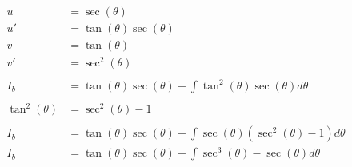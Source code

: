 \documentclass[12pt]{article}
\begin{document}
\begin{align}
    u                                                & = \sec(\theta)                                                                                                                                    \\
    u'                                               & = \tan(\theta)\sec(\theta)                                                                                                                        \\
    v                                                & = \tan(\theta)                                                                                                                                    \\
    v'                                               & = \sec^2(\theta)                                                                                                                                  \\
    \nonumber                                                                                                                                                                                            \\
    I_b                                              & = \tan(\theta)\sec(\theta) - \int \tan^2(\theta)\sec(\theta) d\theta                                                                              \\
    \nonumber                                                                                                                                                                                            \\
    \tan^2(\theta)                                   & = \sec^2(\theta) - 1                                                                                                                              \\
    \nonumber                                                                                                                                                                                            \\
    I_b                                              & = \tan(\theta)\sec(\theta) - \int \sec(\theta)(\sec^2(\theta) - 1) d\theta                                                                        \\
    I_b                                              & = \tan(\theta)\sec(\theta) - \int \sec^3(\theta) - \sec(\theta) d\theta                                                                           \\

\end{align}
\end{document}
